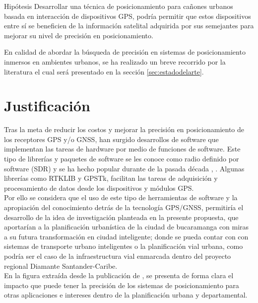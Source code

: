 \begin{example}{Hipótesis}
Desarrollar una técnica de posicionamiento para cañones urbanos basada en interacción de dispositivos GPS, podría permitir que estos dispositivos entre sí se beneficien de la información satelital adquirida por sus semejantes para mejorar su nivel de precisión en posicionamiento.
\end{example}


En calidad de abordar la búsqueda de precisión en sistemas de posicionamiento inmersos en ambientes urbanos, se ha realizado un breve recorrido por la literatura el cual será presentado en la sección \ref{sec:estadodelarte}.\\

\section{Justificación}

Tras la meta de reducir los costos y mejorar la precisión en posicionamiento de los receptores GPS y/o GNSS, han surgido desarrollos de software que implementan las tareas de hardware por medio de funciones de software. Este tipo de librerías y paquetes de software se les conoce como radio definido por software (SDR) y se ha hecho popular durante de la pasada década \cite{Goodman_2003}, \cite{Petovello_2008}. Algunas librerías como RTKLIB\cite{takasu2008evaluation} y GPSTk\cite{ion:gnss04}, facilitan las tareas de adquisición y procesamiento de datos desde los dispositivos y módulos GPS.\\

Por ello se considera que el uso de este tipo de herramientas de software y la apropiación del conocimiento detrás de la tecnología GPS/GNSS, permitiría el desarrollo de la idea de investigación planteada en la presente propuesta, que aportarían a la planificación urbanística de la ciudad de bucaramanga con miras a su futura transformación en ciudad inteligente; donde se pueda contar con con sistemas de transporte urbano inteligentes o la planificación vial urbana, como podría ser el caso de la infraestructura vial enmarcada dentro del proyecto regional Diamante Santander-Caribe.\\

En la figura extraída desde la publicación de \cite{laurini2002information}, se presenta de forma clara el impacto que puede tener la precisión de los sistemas de posicionamiento para otras aplicaciones e intereses dentro de la planificación urbana y departamental.

